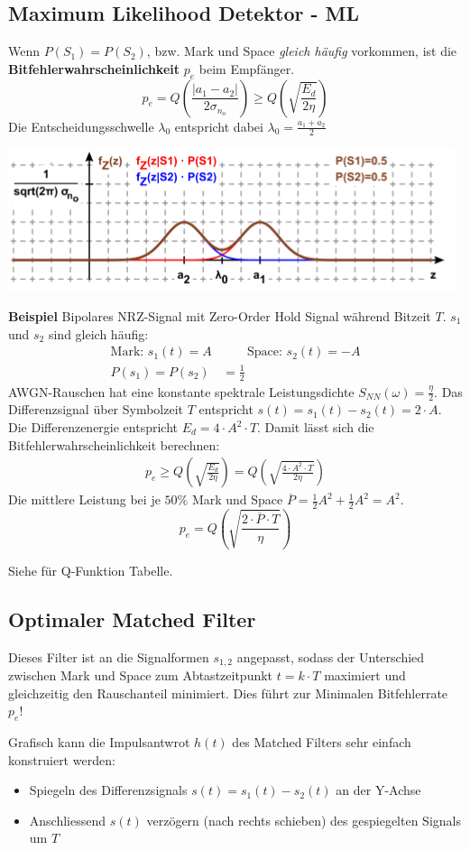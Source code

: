 \subsection{Maximum Likelihood Detektor - ML}
 Wenn $P(S_1) = P(S_2)$, bzw. Mark und Space \textit{gleich häufig} vorkommen, ist die \textbf{Bitfehlerwahrscheinlichkeit} $p_e$ beim Empfänger.
\[
p_e = Q\left(\frac{|a_1 - a_2|}{2\sigma_{n_o}}\right) \geq Q\left(\sqrt{\frac{E_d}{2\eta}}\right)
\]
Die Entscheidungsschwelle $\lambda_0$ entspricht dabei $\lambda_0 = \frac{a_1 + a_2}{2}$
\begin{center}
	\includegraphics[width=0.8\columnwidth]{Images/ml}
\end{center}
\noindent\textbf{Beispiel} Bipolares NRZ-Signal mit Zero-Order Hold Signal während Bitzeit $T$. $s_1$ und $s_2$ sind gleich häufig:\\
\begin{align*}
	\text{Mark: } s_1(t) = A &\qquad \text{Space: } s_2(t) = -A\\
	P(s_1) = P(s_2) &= \frac{1}{2}
\end{align*}
AWGN-Rauschen hat eine konstante spektrale Leistungsdichte $S_{NN}(\omega) = \frac{\eta}{2}$. Das Differenzsignal über Symbolzeit $T$ entspricht $s(t) = s_1(t) - s_2(t) = 2\cdot A$. Die Differenzenergie entspricht $E_d = 4\cdot A^2\cdot T$. Damit lässt sich die Bitfehlerwahrscheinlichkeit berechnen:
\begin{align*}
	p_e \ge Q\left(\sqrt{\frac{E_d}{2\eta}}\right) = Q\left(\sqrt{\frac{4\cdot A^2 \cdot T}{2\eta}}\right)
\end{align*}
Die mittlere Leistung bei je $50\%$ Mark und Space $\overline{P} = \frac{1}{2}A^2 + \frac{1}{2}A^2 = A^2$.
\[
p_e = Q\left(\sqrt{\frac{2\cdot \overline{P} \cdot T}{\eta}}\right)
\]

Siehe  für Q-Funktion Tabelle.

\subsection{Optimaler Matched Filter}
Dieses Filter ist an die Signalformen $s_{1,2}$ angepasst, sodass der Unterschied zwischen Mark und Space zum Abtastzeitpunkt $t =k\cdot T$ maximiert und gleichzeitig den Rauschanteil minimiert. Dies führt zur Minimalen Bitfehlerrate $p_e$!

Grafisch kann die Impulsantwrot $h(t)$ des Matched Filters sehr einfach konstruiert werden:
\begin{itemize}[nosep]
	\item Spiegeln des Differenzsignals $s(t) = s_1(t) - s_2(t)$ an der Y-Achse
	\item Anschliessend $s(t)$ verzögern (nach rechts schieben) des gespiegelten Signals um $T$
\end{itemize}